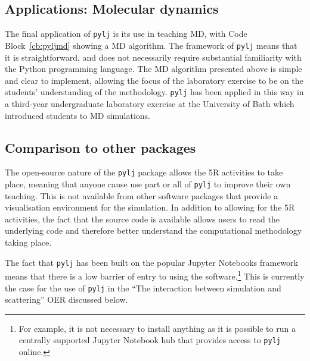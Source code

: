 \subsection{Applications: Molecular dynamics}
The final application of \texttt{pylj} is its use in teaching MD, with Code Block~\ref{cb:pyljmd} showing a MD algorithm.
The framework of \texttt{pylj} means that it is straightforward, and does not necessarily require substantial familiarity with the Python programming language.
The MD algorithm presented above is simple and clear to implement, allowing the focus of the laboratory exercise to be on the students' understanding of the methodology.
\texttt{pylj} has been applied in this way in a third-year undergraduate laboratory exercise at the University of Bath which introduced students to MD simulations.

\subsection{Comparison to other packages}
The open-source nature of the \texttt{pylj} package allows the 5R activities to take place, meaning that anyone cause use part or all of \texttt{pylj} to improve their own teaching.
This is not available from other software packages that provide a visualisation environment for the simulation.
In addition to allowing for the 5R activities, the fact that the source code is available allows users to read the underlying code and therefore better understand the computational methodology taking place.

The fact that \texttt{pylj} has been built on the popular Jupyter Notebooks framework means that there is a low barrier of entry to using the software.\footnote{For example, it is not necessary to install anything as it is possible to run a centrally supported Jupyter Notebook hub that provides access to \texttt{pylj} online.}
This is currently the case for the use of \texttt{pylj} in the ``The interaction between simulation and scattering'' OER discussed below.
